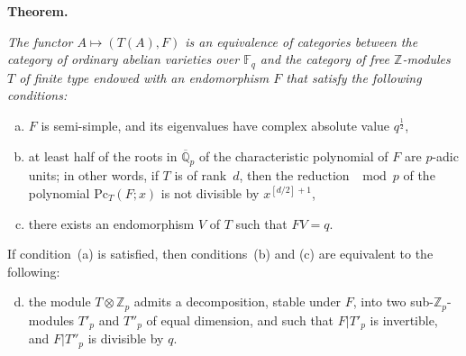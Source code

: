 \documentclass{article}
\newcommand{\FF}{\mathbb{F}}
\newcommand{\ZZ}{\mathbb{Z}}
\newcommand{\QQ}{\mathbb{Q}}
\newcommand{\Pc}{\mathrm{Pc}}
\newcommand{\oldpage}[1]{\marginpar{\footnotesize$\Big\vert$ \textit{p.~#1}}}
\begin{document}
\section{}
\label{7}
\textbf{Theorem.}
{\itshape
  The functor $A\mapsto(T(A),F)$ is an equivalence of categories between the category of ordinary abelian varieties over $\FF_q$ and the category of free $\ZZ$-modules $T$ of finite type endowed with an endomorphism $F$ that satisfy the following conditions:
\oldpage{241}
  \begin{enumerate}[(a)]
    \item $F$ is semi-simple, and its eigenvalues have complex absolute value $q^{\frac12}$,
    \item at least half of the roots in $\overline{\QQ}_p$ of the characteristic polynomial of $F$ are $p$-adic units;
      in other words, if $T$ is of rank~$d$, then the reduction $\mod p$ of the polynomial $\Pc_T(F;x)$ is not divisible by $x^{[d/2]+1}$,
    \item there exists an endomorphism $V$ of $T$ such that $FV=q$.
  \end{enumerate}

  If condition~(a) is satisfied, then conditions~(b) and (c) are equivalent to the following:
  \begin{enumerate}[(a)]
  \setcounter{enumi}{3}
    \item the module $T\otimes\ZZ_p$ admits a decomposition, stable under $F$, into two sub-$\ZZ_p$-modules $T'_p$ and $T''_p$ of equal dimension, and such that $F|T'_p$ is invertible, and $F|T''_p$ is divisible by $q$.
  \end{enumerate}
}
\end{document}
